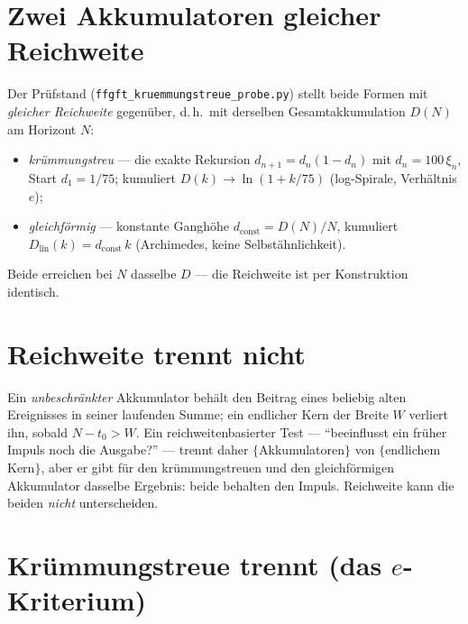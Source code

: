 \section{Zwei Akkumulatoren gleicher Reichweite}

Der Prüfstand (\texttt{ffgft\_kruemmungstreue\_probe.py}) stellt beide Formen mit \emph{gleicher
Reichweite} gegenüber, d.\,h.\ mit derselben Gesamtakkumulation $D(N)$ am Horizont $N$:
\begin{itemize}
\item \emph{krümmungstreu} --- die exakte Rekursion $d_{n+1}=d_n(1-d_n)$ mit $d_n=100\,\xi_n$,
Start $d_1=1/75$; kumuliert $D(k)\to\ln(1+k/75)$ (log-Spirale, Verhältnis $e$);
\item \emph{gleichförmig} --- konstante Ganghöhe $d_{\text{const}}=D(N)/N$, kumuliert
$D_{\text{lin}}(k)=d_{\text{const}}\,k$ (Archimedes, keine Selbstähnlichkeit).
\end{itemize}
Beide erreichen bei $N$ dasselbe $D$ --- die Reichweite ist per Konstruktion identisch.

\section{Reichweite trennt nicht}

Ein \emph{unbeschränkter} Akkumulator behält den Beitrag eines beliebig alten Ereignisses in
seiner laufenden Summe; ein endlicher Kern der Breite $W$ verliert ihn, sobald $N-t_0>W$. Ein
reichweitenbasierter Test --- \enquote{beeinflusst ein früher Impuls noch die Ausgabe?} ---
trennt daher $\{$Akkumulatoren$\}$ von $\{$endlichem Kern$\}$, aber er gibt für den
krümmungstreuen und den gleichförmigen Akkumulator dasselbe Ergebnis: beide behalten den
Impuls. Reichweite kann die beiden \emph{nicht} unterscheiden.

\section{Krümmungstreue trennt (das $e$-Kriterium)}

